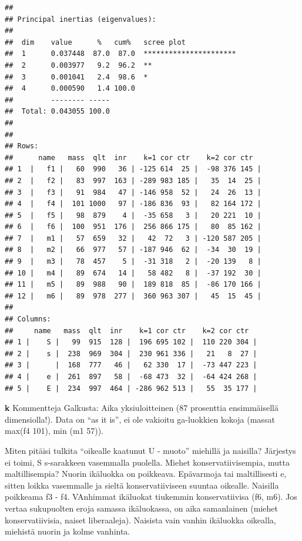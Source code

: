\documentclass[
  finnish,
]{book}
\begin{document}
\begin{verbatim}
## 
## Principal inertias (eigenvalues):
## 
##  dim    value      %   cum%   scree plot               
##  1      0.037448  87.0  87.0  **********************   
##  2      0.003977   9.2  96.2  **                       
##  3      0.001041   2.4  98.6  *                        
##  4      0.000590   1.4 100.0                           
##         -------- -----                                 
##  Total: 0.043055 100.0                                 
## 
## 
## Rows:
##      name   mass  qlt  inr    k=1 cor ctr    k=2 cor ctr  
## 1  |   f1 |   60  990   36 | -125 614  25 |  -98 376 145 |
## 2  |   f2 |   83  997  163 | -289 983 185 |   35  14  25 |
## 3  |   f3 |   91  984   47 | -146 958  52 |   24  26  13 |
## 4  |   f4 |  101 1000   97 | -186 836  93 |   82 164 172 |
## 5  |   f5 |   98  879    4 |  -35 658   3 |   20 221  10 |
## 6  |   f6 |  100  951  176 |  256 866 175 |   80  85 162 |
## 7  |   m1 |   57  659   32 |   42  72   3 | -120 587 205 |
## 8  |   m2 |   66  977   57 | -187 946  62 |  -34  30  19 |
## 9  |   m3 |   78  457    5 |  -31 318   2 |  -20 139   8 |
## 10 |   m4 |   89  674   14 |   58 482   8 |  -37 192  30 |
## 11 |   m5 |   89  988   90 |  189 818  85 |  -86 170 166 |
## 12 |   m6 |   89  978  277 |  360 963 307 |   45  15  45 |
## 
## Columns:
##     name   mass  qlt  inr    k=1 cor ctr    k=2 cor ctr  
## 1 |    S |   99  915  128 |  196 695 102 |  110 220 304 |
## 2 |    s |  238  969  304 |  230 961 336 |   21   8  27 |
## 3 |      |  168  777   46 |   62 330  17 |  -73 447 223 |
## 4 |    e |  261  897   58 |  -68 473  32 |  -64 424 268 |
## 5 |    E |  234  997  464 | -286 962 513 |   55  35 177 |
\end{verbatim}

\textbf{k} Kommentteja Galkusta: Aika yksiuloitteinen (87 prosenttia
ensimmäisellä dimensiolla!). Data on ``as it is'', ei ole vakioitu
ga-luokkien kokoja (massat max(f4 101), min (m1 57)).

Miten pitäisi tulkita ``oikealle kaatunut U - muoto'' miehillä ja
naisilla? Järjestys ei toimi, S s-sarakkeen vasemmalla puolella. Miehet
konservatiivisempia, mutta maltillisempia? Nuorin ikäluokka on
poikkeava. Epävarmoja tai maltillisesti e, sitten loikka vasemmalle ja
sieltä konservatiiviseen suuntaa oikealle. Naisilla poikkeama f3 - f4.
VAnhimmat ikäluokat tiukemmin konservatiivisa (f6, m6). Jos vertaa
sukupuolten eroja samassa ikäluokassa, on aika samanlainen (miehet
konservatiivisia, naiset liberaaleja). Naisista vain vanhin ikäluokka
oikealla, miehistä nuorin ja kolme vanhinta.
\end{document}
